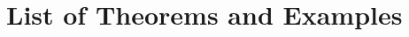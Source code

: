 \documentclass[doctor]{iscs-thesis}
\date{\fix{XXX}}
\begin{document}


\maketitle



\frontmatter
\tableofcontents

\listoffigures

\chapter*{List of Theorems and Examples}


\mainmatter





% 



\appendix





\printindex
\end{document}
